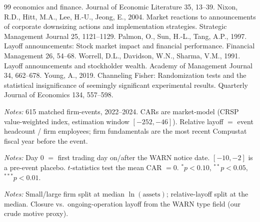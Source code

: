 \documentclass[12pt]{article}
\begin{document}
\begin{thebibliography}{99}
economics and finance. Journal of Economic Literature 35, 13--39.
 Nixon, R.D., Hitt, M.A., Lee, H.-U., Jeong,
E., 2004. Market reactions to announcements of corporate downsizing actions and
implementation strategies. Strategic Management Journal 25, 1121--1129.
Palmon, O., Sun, H.-L., Tang, A.P., 1997. Layoff announcements: Stock market impact and financial performance. Financial Management 26, 54--68.
 Worrell, D.L., Davidson, W.N., Sharma,
V.M., 1991. Layoff announcements and stockholder wealth. Academy of Management
Journal 34, 662--678.
 Young, A., 2019. Channeling Fisher: Randomization
tests and the statistical insignificance of seemingly significant experimental
results. Quarterly Journal of Economics 134, 557--598.
\end{thebibliography}

\FloatBarrier
\newpage
\begin{table}[htbp]\centering
\begin{threeparttable}
\caption{Summary statistics}\label{tab:sumstats}\small

\begin{tablenotes}\small\item \textit{Notes:} 615 matched firm-events, 2022--2024.
CARs are market-model (CRSP value-weighted index, estimation window
$[-252,-46]$). Relative layoff $=$ event headcount / firm employees; firm
fundamentals are the most recent Compustat fiscal year before the event.
\end{tablenotes}
\end{threeparttable}
\end{table}

\begin{table}[htbp]\centering
\begin{threeparttable}
\caption{Cumulative abnormal returns around WARN notices, by window}\label{tab:cars}\small

\begin{tablenotes}\small\item \textit{Notes:} Day 0 $=$ first trading day on/after
the WARN notice date. $[-10,-2]$ is a pre-event placebo. $t$-statistics test the
mean CAR $=0$. $^{*}p<0.10$, $^{**}p<0.05$, $^{***}p<0.01$.
\end{tablenotes}
\end{threeparttable}
\end{table}

\begin{table}[htbp]\centering
\begin{threeparttable}
\caption{Mean CAR[0,+5] by subgroup}\label{tab:groups}\small

\begin{tablenotes}\small\item \textit{Notes:} Small/large firm split at median
$\ln(\text{assets})$; relative-layoff split at the median. Closure vs.\
ongoing-operation layoff from the WARN type field (our crude motive proxy).
\end{tablenotes}
\end{threeparttable}
\end{table}
\end{document}
